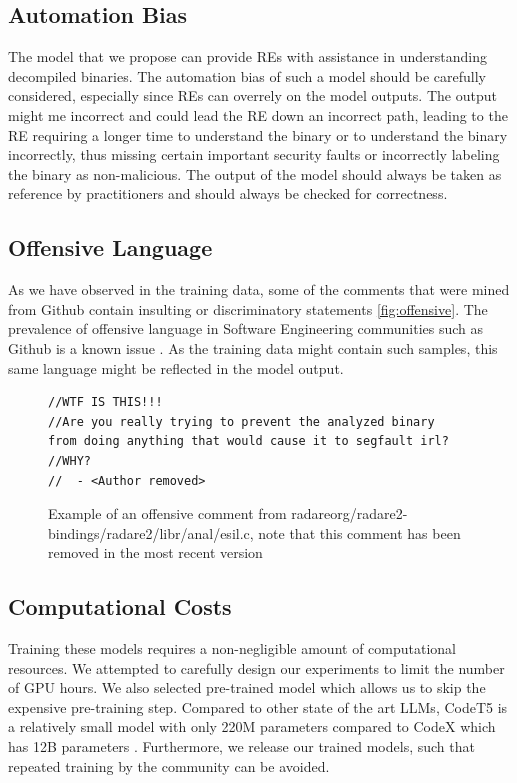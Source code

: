 \subsection{Automation Bias}
The model that we propose can provide REs with assistance in understanding decompiled binaries. The automation bias of such a model should be carefully considered, especially since REs can overrely on the model outputs. The output might me incorrect and could lead the RE down an incorrect path, leading to the RE requiring a longer time to understand the binary or to understand the binary incorrectly, thus missing certain important security faults or incorrectly labeling the binary as non-malicious. The output of the model should always be taken as reference by practitioners and should always be checked for correctness.

\subsection{Offensive Language}
As we have observed in the training data, some of the comments that were mined from Github contain insulting or discriminatory statements \ref{fig:offensive}. The prevalence of offensive language in Software Engineering communities such as Github is a known issue \cite{OffensiveLanguage}. As the training data might contain such samples, this same language might be reflected in the model output. 
\label{fig:offensive}
\begin{figure}[H]
  \centering
\begin{lstlisting}
//WTF IS THIS!!!
//Are you really trying to prevent the analyzed binary 
from doing anything that would cause it to segfault irl?
//WHY?
//	- <Author removed>
\end{lstlisting}
  \caption{Example of an offensive comment from radareorg/radare2-bindings/radare2/libr/anal/esil.c, note that this comment has been removed in the most recent version}
\end{figure}


\subsection{Computational Costs}
Training these models requires a non-negligible amount of computational resources. We attempted to carefully design our experiments to limit the number of GPU hours. We also selected pre-trained model which allows us to skip the expensive pre-training step. Compared to other state of the art LLMs, CodeT5 is a relatively small model with only 220M parameters compared to CodeX which has 12B parameters \cite{CodeX}. Furthermore, we release our trained models, such that repeated training by the community can be avoided.

